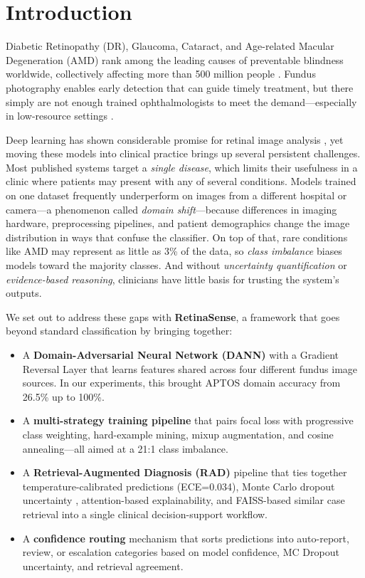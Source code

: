 \documentclass[conference]{IEEEtran}
\begin{document}
\section{Introduction}

Diabetic Retinopathy (DR), Glaucoma, Cataract, and Age-related Macular Degeneration (AMD) rank among the leading causes of preventable blindness worldwide, collectively affecting more than 500 million people \cite{b1,b27}. Fundus photography enables early detection that can guide timely treatment, but there simply are not enough trained ophthalmologists to meet the demand---especially in low-resource settings \cite{b2}.

Deep learning has shown considerable promise for retinal image analysis \cite{b3,b4}, yet moving these models into clinical practice brings up several persistent challenges. Most published systems target a \textit{single disease}, which limits their usefulness in a clinic where patients may present with any of several conditions. Models trained on one dataset frequently underperform on images from a different hospital or camera---a phenomenon called \textit{domain shift}---because differences in imaging hardware, preprocessing pipelines, and patient demographics change the image distribution in ways that confuse the classifier. On top of that, rare conditions like AMD may represent as little as 3\% of the data, so \textit{class imbalance} biases models toward the majority classes. And without \textit{uncertainty quantification} or \textit{evidence-based reasoning}, clinicians have little basis for trusting the system's outputs.

We set out to address these gaps with \textbf{RetinaSense}, a framework that goes beyond standard classification by bringing together:

\begin{itemize}
    \item A \textbf{Domain-Adversarial Neural Network (DANN)} with a Gradient Reversal Layer \cite{b13} that learns features shared across four different fundus image sources. In our experiments, this brought APTOS domain accuracy from 26.5\% up to 100\%.
    \item A \textbf{multi-strategy training pipeline} that pairs focal loss with progressive class weighting, hard-example mining, mixup augmentation, and cosine annealing---all aimed at a 21:1 class imbalance.
    \item A \textbf{Retrieval-Augmented Diagnosis (RAD)} pipeline that ties together temperature-calibrated predictions (ECE=0.034), Monte Carlo dropout uncertainty \cite{b7}, attention-based explainability, and FAISS-based similar case retrieval \cite{b9} into a single clinical decision-support workflow.
    \item A \textbf{confidence routing} mechanism that sorts predictions into auto-report, review, or escalation categories based on model confidence, MC Dropout uncertainty, and retrieval agreement.
\end{itemize}
\end{document}
